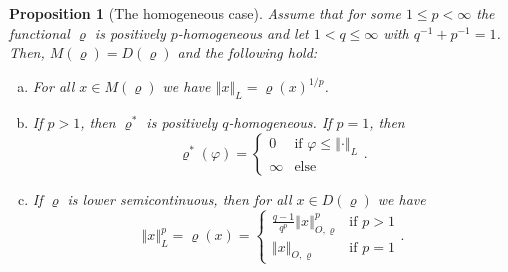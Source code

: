\documentclass[a4paper,11pt,reqno]{amsart}
\newtheorem{proposition}[lemma]{Proposition}
\theoremstyle{definition}
\newtheorem{remark}[lemma]{Remark}
\numberwithin{equation}{section}
\newcommand{\vr}{{\varrho}}
\newcommand{\av}[1]{\left\Vert #1\right\Vert}
\newcommand{\1}{\mathds{1}}
\begin{document}
  
 
 
 




\begin{proposition}[The homogeneous case] \label{prop:seminorms for homogenous functionals}
Assume that for some $1 \leq p < \infty$ the functional $\vr$ is positively $p$-homogeneous and let $1 < q \leq \infty$ with $q^{-1} + p^{-1} = 1$. Then, $M(\vr) = D(\vr)$ and the following hold: 
\begin{enumerate}[(a)]
 \item For all $x \in M(\vr)$ we have $\av{x}_L = \vr(x)^{1/p}$. 
 \item If $p > 1$, then $\vr^*$ is positively $q$-homogeneous. If $p = 1$, then 
 $$\vr^*(\varphi) = \begin{cases}
                    0 &\text{if } \varphi \leq \av{\cdot}_L\\
                    \infty& \text{else } 
                   \end{cases}.
$$
 \item If $\vr$ is lower semicontinuous, then for all $x \in D(\vr)$ we have
 $$\av{x}_L^p = \vr(x) = \begin{cases}
                          \frac{q-1}{q^p} \av{x}_{O,\vr}^p &\text{if } p > 1\\
                          \av{x}_{O,\vr} &\text{if } p = 1
                         \end{cases}.$$
\end{enumerate}
\end{proposition}
\end{document}
